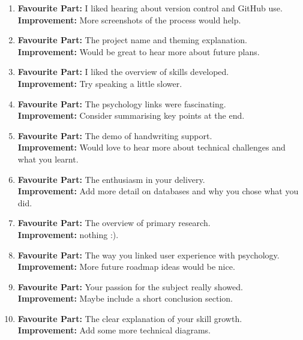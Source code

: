 \begin{enumerate}
    \item \textbf{Favourite Part:} I liked hearing about version control and GitHub use. \\
          \textbf{Improvement:} More screenshots of the process would help.

    \item \textbf{Favourite Part:} The project name and theming explanation. \\
          \textbf{Improvement:} Would be great to hear more about future plans.

    \item \textbf{Favourite Part:} I liked the overview of skills developed. \\
          \textbf{Improvement:} Try speaking a little slower.

    \item \textbf{Favourite Part:} The psychology links were fascinating. \\
          \textbf{Improvement:} Consider summarising key points at the end.

    \item \textbf{Favourite Part:} The demo of handwriting support. \\
          \textbf{Improvement:} Would love to hear more about technical challenges and what you learnt.


    \item \textbf{Favourite Part:} The enthusiasm in your delivery. \\
          \textbf{Improvement:} Add more detail on databases and why you chose what you did.

    \item \textbf{Favourite Part:} The overview of primary research. \\
          \textbf{Improvement:} nothing :).

    \item \textbf{Favourite Part:} The way you linked user experience with psychology. \\
          \textbf{Improvement:} More future roadmap ideas would be nice.

    \item \textbf{Favourite Part:} Your passion for the subject really showed. \\
          \textbf{Improvement:} Maybe include a short conclusion section.

    \item \textbf{Favourite Part:} The clear explanation of your skill growth. \\
          \textbf{Improvement:} Add some more technical diagrams.


\end{enumerate}
